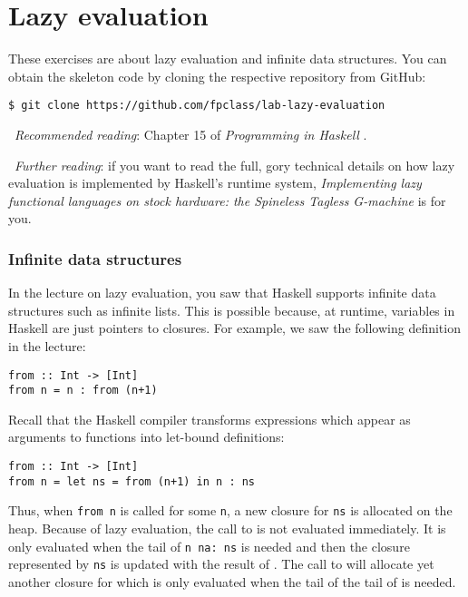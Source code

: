 \section{Lazy evaluation}

These exercises are about lazy evaluation and infinite data structures. You can obtain the skeleton code by cloning the respective repository from GitHub:
\begin{verbatim}
$ git clone https://github.com/fpclass/lab-lazy-evaluation
\end{verbatim}

\makebox[0.5cm]{\faBook}~\emph{Recommended reading}: Chapter 15 of \emph{Programming in Haskell} \citep{hutton2016programming}.

\makebox[0.5cm]{\faBook}~\emph{Further reading}: if you want to read the full, gory technical details on how lazy evaluation is implemented by Haskell's runtime system, \emph{Implementing lazy functional languages on stock hardware: the Spineless Tagless G-machine} \citep{jones1992implementing} is for you.

\subsubsection{Infinite data structures}

In the lecture on lazy evaluation, you saw that Haskell supports infinite data structures such as infinite lists. This is possible because, at runtime, variables in Haskell are just pointers to closures. For example, we saw the following definition in the lecture:
\begin{verbatim}
from :: Int -> [Int]
from n = n : from (n+1)
\end{verbatim}
Recall that the Haskell compiler transforms expressions which appear as arguments to functions into let-bound definitions:
\begin{verbatim}
from :: Int -> [Int]
from n = let ns = from (n+1) in n : ns
\end{verbatim}
Thus, when \texttt{\small from n} is called for some \texttt{\small n}, a new closure for \texttt{\small ns} is allocated on the heap. Because of lazy evaluation, the call to  is not evaluated immediately. It is only evaluated when the tail of \texttt{\small n~na:~ns} is needed and then the closure represented by \texttt{\small ns} is updated with the result of . The call to  will allocate yet another closure for  which is only evaluated when the tail of the tail of  is needed.

